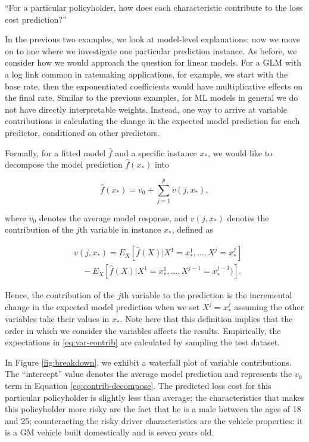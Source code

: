 \documentclass[preprint, 3p, twocolumn, letterpaper, 10pt]{elsarticle} %
\begin{document}
``For a particular policyholder, how does each characteristic contribute to the
loss cost prediction?''

In the previous two examples, we look at model-level explanations; now we
move on to one where we investigate one particular prediction instance. As
before, we consider how we would approach the question for linear models. For
a GLM with a log link common in ratemaking applications, for example, we start
with the base rate, then the exponentiated coefficients would have
multiplicative effects on the final rate. Similar to the previous examples,
for ML models in general we do not have directly interpretable weights.
Instead, one way to arrive at variable contributions is calculating the change
in the expected model prediction for each predictor, conditioned on other
predictors.

Formally, for a fitted model \(\widehat{f}\) and a specific instance \(x_*\), we
would like to decompose the model prediction \(\widehat{f}(x_*)\) into

\begin{equation}\label{eq:contrib-decompose}
\widehat{f}(x_* ) = v_0 + \sum_{j=1}^p v(j, x_*),
\end{equation}

where \(v_0\) denotes the average model response, and \(v(j, x_*)\) denotes the
contribution of the \(j\)th variable in instance \(x_*\), defined as

\begin{align}\label{eq:var-contrib}
& v(j, x_* ) = E_X[\widehat{f}(X) | X^1 = x_* ^1, \dots, X^j = x_* ^j] \nonumber\\
& \quad - E_X[\widehat{f}(X) | X^1 = x_* ^1, \dots, X^{j-1} = x_*^{j - 1})].
\end{align}

Hence, the contribution of the \(j\)th variable to the prediction is the
incremental change in the expected model prediction when we set \(X^j = x_*^ j\)
assuming the other variables take their values in \(x_*\). Note here that this
definition implies that the order in which we consider the variables affects
the results. Empirically, the expectations in \eqref{eq:var-contrib} are
calculated by sampling the test dataset.

In Figure \ref{fig:breakdown}, we exhibit a waterfall plot of variable
contributions. The ``intercept'' value denotes the average model prediction and
represents the \(v_0\) term in Equation \eqref{eq:contrib-decompose}. The predicted
loss cost for this particular policyholder is slightly less than average; the
characteristics that makes this policyholder more risky are the fact that he is
a male between the ages of 18 and 25; counteracting the risky driver
characteristics are the vehicle properties: it is a GM vehicle built
domestically and is seven years old.
\end{document}
